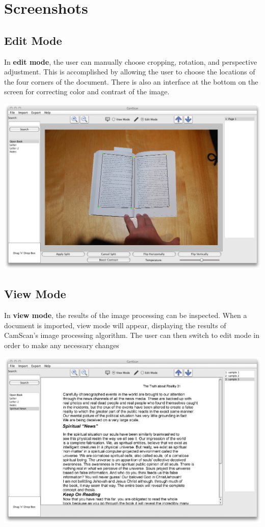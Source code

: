 \documentclass[11pt]{article}
\begin{document}
\section*{Screenshots}

\subsection*{Edit Mode}

In \textbf{edit mode}, the user can manually choose cropping, rotation, and perspective adjustment. This is accomplished by allowing the user to choose the locations of the four corners of the document. There is also an interface at the bottom on the screen for correcting color and contrast of the image.

\centering
\includegraphics[scale=0.3]{editmode}
\flushleft

\subsection*{View Mode}

In \textbf{view mode}, the results of the image processing can be inspected. When a document is imported, view mode will appear, displaying the results of CamScan's image processing algorithm. The user can then switch to edit mode in order to make any necessary changes

\centering
\includegraphics[scale=0.3]{viewmode}
\flushleft
\end{document}
